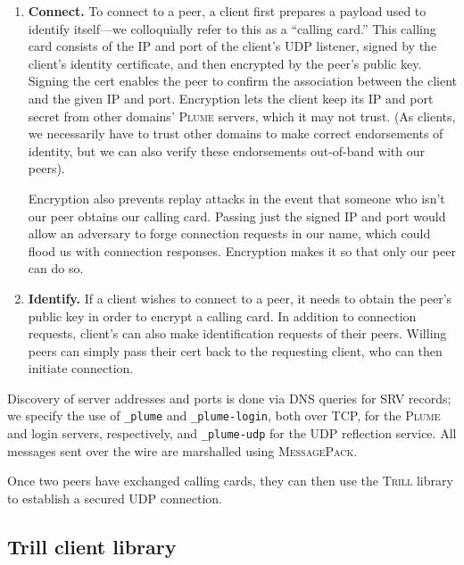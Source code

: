 \documentclass[11pt]{article}
\newcommand{\Trill}{\textsc{Trill}\xspace}
\newcommand{\Plume}{\textsc{Plume}\xspace}
\begin{document}
\begin{enumerate}
  \item \textbf{Connect.}  To connect to a peer, a client first prepares a
    payload used to identify itself---we colloquially refer to this as a
    ``calling card.''  This calling card consists of the IP and port of the
    client's UDP listener, signed by the client's identity certificate, and
    then encrypted by the peer's public key.  Signing the cert enables the peer
    to confirm the association between the client and the given IP and port.
    Encryption lets the client keep its IP and port secret from other domains'
    \Plume servers, which it may not trust.  (As clients, we necessarily have
    to trust other domains to make correct endorsements of identity, but we can
    also verify these endorsements out-of-band with our peers).

    Encryption also prevents replay attacks in the event that someone who isn't
    our peer obtains our calling card.  Passing just the signed IP and port
    would allow an adversary to forge connection requests in our name, which
    could flood us with connection responses.  Encryption makes it so that only
    our peer can do so.

  \item \textbf{Identify.}  If a client wishes to connect to a peer, it needs
    to obtain the peer's public key in order to encrypt a calling card.  In
    addition to connection requests, client's can also make identification
    requests of their peers.  Willing peers can simply pass their cert back to
    the requesting client, who can then initiate connection.
\end{enumerate}

Discovery of server addresses and ports is done via DNS queries for SRV
records; we specify the use of \verb`_plume` and \verb`_plume-login`, both over
TCP, for the \Plume and login servers, respectively, and \verb`_plume-udp` for
the UDP reflection service.  All messages sent over the wire are marshalled
using \textsc{MessagePack}.

Once two peers have exchanged calling cards, they can then use the \Trill
library to establish a secured UDP connection.

\subsection{Trill client library}
\end{document}
